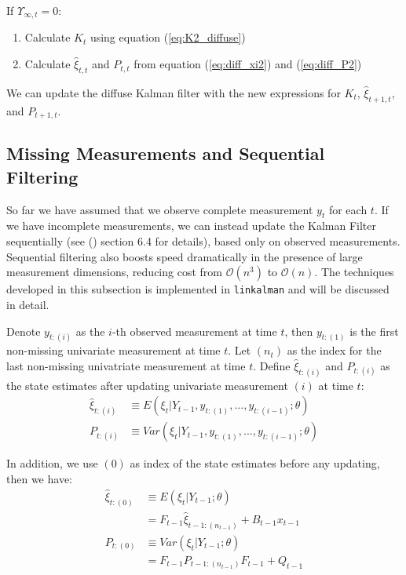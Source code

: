 \documentclass[12pt]{article}
\newenvironment{boenumerate}
    {\begin{enumerate}\renewcommand\labelenumi{\textbf\theenumi}}
    {\end{enumerate}}
\numberwithin{equation}{section}
\begin{document}
If $\Upsilon_{\infty,t}=0$:
\begin{boenumerate}
    \item Calculate $K_t$ using equation (\ref{eq:K2_diffuse})
    \item Calculate $\hat{\xi}_{t,t}$ and $P_{t,t}$ from equation (\ref{eq:diff_xi2}) and (\ref{eq:diff_P2})
\end{boenumerate}

We can update the diffuse Kalman filter with the new expressions for $K_t$, $\hat{\xi}_{t+1,t}$, and $P_{t+1,t}$.

\subsection{Missing Measurements and Sequential Filtering} \label{subsec:seq_filter}
So far we have assumed that we observe complete measurement $y_t$ for each $t$. If we have incomplete measurements, we can instead update the Kalman Filter sequentially (see (\cite{durbin_koopman_2001}) section 6.4 for details), based only on observed measurements. Sequential filtering also boosts speed dramatically in the presence of large measurement dimensions, reducing cost from $\mathcal{O}(n^3)$ to $\mathcal{O}(n)$. The techniques developed in this subsection is implemented in \texttt{linkalman} and will be discussed in detail. 

Denote $y_{t:(i)}$ as the $i$-th observed measurement at time $t$, then $y_{t:(1)}$ is the first non-missing univariate measurement at time $t$. Let $(n_t)$ as the index for the last non-missing univatriate measurement at time $t$. Define $\hat{\xi}_{t:(i)}$ and $P_{t:(i)}$ as the state estimates after updating univariate measurement $(i)$ at time $t$:
\begin{align*}
    \hat{\xi}_{t:(i)} &\equiv E(\xi_t|Y_{t-1},y_{t:(1)},...,y_{t:(i-1)};\theta) \\
    P_{t:(i)} &\equiv Var(\xi_t|Y_{t-1},y_{t:(1)},...,y_{t:(i-1)};\theta) 
\end{align*}

In addition, we use $(0)$ as index of the state estimates before any updating, then we have:
\begin{align}
    \hat{\xi}_{t:(0)} &\equiv E(\xi_{t}|Y_{t-1};\theta)\nonumber \\
    &= F_{t-1}\hat{\xi}_{t-1:(n_{t-1})}+B_{t-1}x_{t-1} \label{eq:diff_xi_seq0} \\
    P_{t:(0)} &\equiv Var(\xi_{t}|Y_{t-1};\theta) \nonumber \\
    &= F_{t-1}P_{t-1:(n_{t-1})}F_{t-1} + Q_{t-1} \label{eq:diff_P_seq0}
\end{align}
\end{document}
